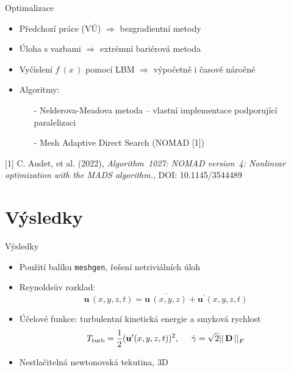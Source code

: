 \documentclass[aspectratio=169,xcolor=dvipsnames]{beamer}
\newcommand{\vect}[1]{\mathbf{#1}}
\begin{document}
\begin{frame}{Optimalizace}
	\begin{itemize}
		\setlength\itemsep{1.8em}
		\item Předchozí práce (VÚ) $\Rightarrow$ bezgradientní metody
		\item Úloha s vazbami $\Rightarrow$ extrémní bariérová metoda
		\item Vyčíslení $ f \ (x \, ) $ pomocí LBM $\Rightarrow$ \alert{výpočetně i časově náročné}
		\item Algoritmy:
			 \begin{itemize}
				\item[-] Nelderova-Meadova metoda -- vlastní implementace \alert{podporující paralelizaci}
				\item[-] Mesh Adaptive Direct Search (NOMAD [1])
			 \end{itemize}
	\end{itemize}
\vspace{5.5mm}
\tiny{[1] C. Audet, et al. (2022)}, \textit{Algorithm~1027: NOMAD version~4: Nonlinear optimization with the MADS algorithm.}, DOI: 10.1145/3544489\\
\end{frame}



\section{Výsledky}
\begin{frame}{Výsledky}
	\begin{itemize}
		\setlength\itemsep{1.4em}
		\item Použití balíku \texttt{meshgen}, řešení netriviálních úloh
		\item Reynoldsův rozklad:
				$$ \vect{u} \,(x, y, z, t) = \overline{\vect{u} \,(x, y, z)} + \vect{u}^\prime(x, y, z, t) $$
		\item Účelové funkce: turbulentní kinetická energie a smyková rychlost
				$$ T_{\mathrm{turb}} = \frac{1}{2} (\vect{u}^\prime(x, y, z, t) )^2, \hspace{5mm} \dot{\gamma} = \sqrt{2} || \, \mathbf{D} \, ||^{}_{F}$$
		\item Nestlačitelná newtonovská tekutina, 3D
	\end{itemize}
\end{frame}
\end{document}
